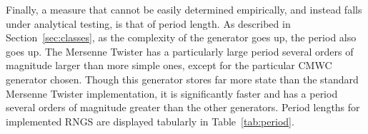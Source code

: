 

Finally, a measure that cannot be easily determined empirically, and instead falls under analytical testing, is that of period length. As described in Section~\ref{sec:classes}, as the complexity of the generator goes up, the period also goes up. The Mersenne Twister has a particularly large period several orders of magnitude larger than more simple ones, except for the particular CMWC generator chosen. Though this generator stores far more state than the standard Mersenne Twister implementation, it is significantly faster and has a period several orders of magnitude greater than the other generators. Period lengths for implemented RNGS are displayed tabularly in Table~\ref{tab:period}.


